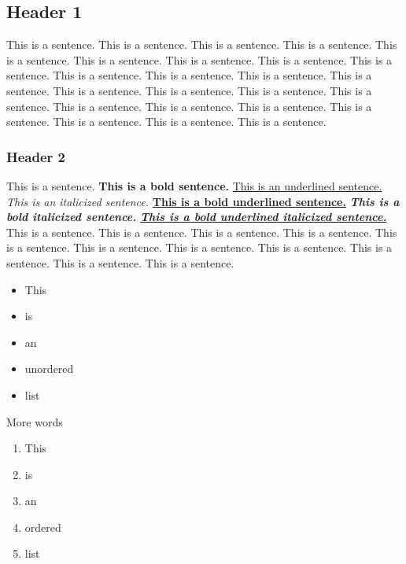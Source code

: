 \label{019dffd4-962e-7c03-8a1c-bd9e1462c553}

\subsection{Header 1}

This is a sentence. This is a sentence. This is a sentence. This is a sentence. This is a sentence. This is a sentence. This is a sentence. This is a sentence. This is a sentence. This is a sentence. This is a sentence. This is a sentence. This is a sentence. This is a sentence. This is a sentence. This is a sentence. This is a sentence. This is a sentence. This is a sentence. This is a sentence. This is a sentence. This is a sentence. This is a sentence. This is a sentence.

\subsubsection{Header 2}

This is a sentence. \textbf{This is a bold sentence.} \underline{This is an underlined sentence.} \textit{This is an italicized sentence.} \underline{\textbf{This is a bold underlined sentence.}}\textbf{ }\textit{\textbf{This is a bold italicized sentence.}} \underline{\textit{\textbf{This is a bold underlined italicized sentence.}}} This is a sentence. This is a sentence. This is a sentence. This is a sentence. This is a sentence. This is a sentence. This is a sentence. This is a sentence. This is a sentence. This is a sentence. This is a sentence.

\begin{itemize}
  \item This
  \item is
  \item an
  \item unordered
  \item list
\end{itemize}

More words

\begin{enumerate}
  \item This
  \item is
  \item an
  \item ordered
  \item list
\end{enumerate}

